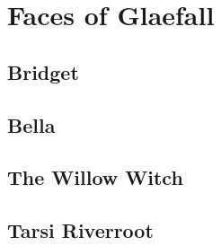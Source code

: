 \chapter{Faces of Glaefall}

\section{Bridget}

\section{Bella}

\section{The Willow Witch}

\section{Tarsi Riverroot}